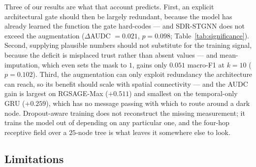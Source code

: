 \documentclass[3p,times,procedia]{elsarticle}
\begin{document}
Three of our results are what that account predicts. First, an explicit architectural gate should then be largely redundant, because the model has already learned the function the gate hard-codes --- and SDR-STGNN does not exceed the augmentation ($\Delta$AUDC $=0.021$, $p=0.098$; Table~\ref{tab:significance}). Second, supplying plausible numbers should not substitute for the training signal, because the deficit is misplaced trust rather than absent values --- and mean-imputation, which even sets the mask to $1$, gains only $0.051$ macro-F1 at $k=10$ ($p=0.102$). Third, the augmentation can only exploit redundancy the architecture can reach, so its benefit should scale with spatial connectivity --- and the AUDC gain is largest on RGSAGE-Max ($+0.511$) and smallest on the temporal-only GRU ($+0.259$), which has no message passing with which to route around a dark node. Dropout-aware training does not reconstruct the missing measurement; it trains the model out of depending on any particular one, and the four-hop receptive field over a $25$-node tree is what leaves it somewhere else to look.

\subsection{Limitations}
\end{document}
